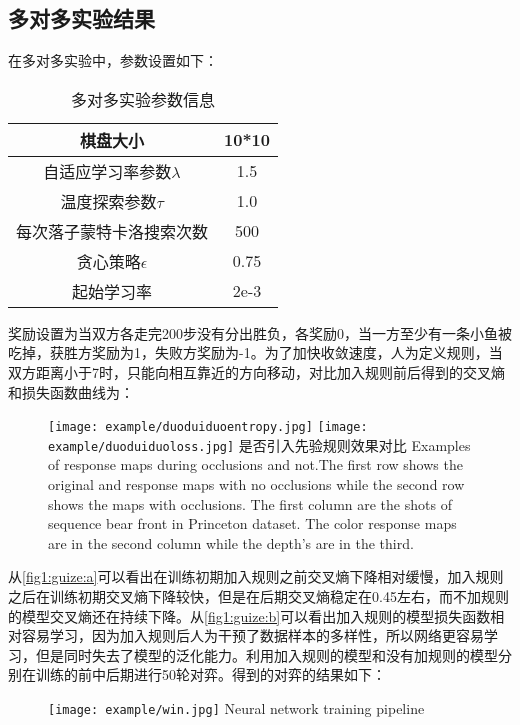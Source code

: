 \subsection{多对多实验结果}
在多对多实验中，参数设置如下：
\begin{table}
	\centering
	\caption{多对多实验参数信息}
	\begin{tabular}{c|c}
		\hline 
		棋盘大小 & 10*10 \\ 
		\hline 
		自适应学习率参数$\lambda$ & 1.5 \\ 
		\hline 
		温度探索参数$\tau$& 1.0 \\ 
		\hline 
		每次落子蒙特卡洛搜索次数 & 500 \\ 
		\hline 
		贪心策略$\epsilon$ & 0.75 \\ 
		\hline 
		起始学习率 & 2e-3
	\end{tabular} 
\end{table}
奖励设置为当双方各走完200步没有分出胜负，各奖励0，当一方至少有一条小鱼被吃掉，获胜方奖励为1，失败方奖励为-1。为了加快收敛速度，人为定义规则，当双方距离小于7时，只能向相互靠近的方向移动，对比加入规则前后得到的交叉熵和损失函数曲线为：
\begin{figure}[!bpt]
	\centering
	{\texttt{[image: example/duoduiduoentropy.jpg]}}
	\hspace{0.5em}
	{\texttt{[image: example/duoduiduoloss.jpg]}}
	\bicaption
	{是否引入先验规则效果对比}
	{Examples of response maps during occlusions and not.The first row shows the original and response maps with no occlusions while the second row shows the maps with occlusions. The first column are the shots of sequence bear front in Princeton dataset. The color response maps are in the second column while the depth’s are in the third.}
	\label{fig1:guize}
\end{figure}
从\ref{fig1:guize:a}可以看出在训练初期加入规则之前交叉熵下降相对缓慢，加入规则之后在训练初期交叉熵下降较快，但是在后期交叉熵稳定在0.45左右，而不加规则的模型交叉熵还在持续下降。从\ref{fig1:guize:b}可以看出加入规则的模型损失函数相对容易学习，因为加入规则后人为干预了数据样本的多样性，所以网络更容易学习，但是同时失去了模型的泛化能力。利用加入规则的模型和没有加规则的模型分别在训练的前中后期进行50轮对弈。得到的对弈的结果如下：
\begin{figure}[!hbtp]
	\centering
	\texttt{[image: example/win.jpg]}
	{Neural network training pipeline}
	\label{fig:win}
\end{figure}


